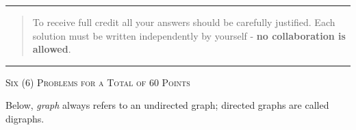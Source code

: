 \documentclass[11pt]{article}
\begin{document}


\rule{\textwidth}{0.4pt}
\begin{quote}
To receive full
credit all your answers should be carefully justified.
Each solution must be written independently by yourself - \textbf{no collaboration is allowed}.
\end{quote}
\rule{\textwidth}{0.4pt}

\textsc{Six (6) Problems for a Total of 60 Points}




Below, \emph{graph} always refers to an undirected graph; directed graphs are called digraphs.
\end{document}

